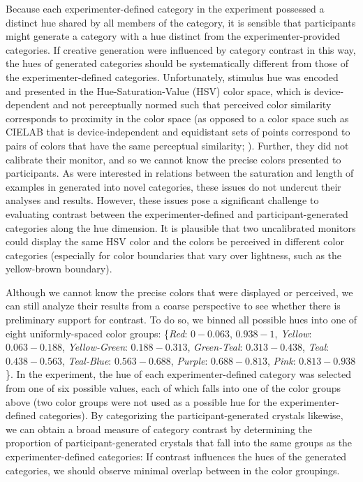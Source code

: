 \documentclass[12pt]{article}
\begin{document}
\begin{flushleft}
Because each experimenter-defined category in the \cite{jern2013probabilistic} experiment possessed a distinct hue shared by all members of the category, it is sensible that participants might generate a category with a hue distinct from the experimenter-provided categories. If creative generation were influenced by category contrast in this way, the hues of generated categories should be systematically different from those of the experimenter-defined categories. Unfortunately, stimulus hue was encoded and presented in the Hue-Saturation-Value (HSV) color space, which is device-dependent and not perceptually normed such that perceived color similarity corresponds to proximity in the color space (as opposed to a color space such as CIELAB that is device-independent and equidistant sets of points correspond to pairs of colors that have the same perceptual similarity; \citealp{wyszecki1967}). Further, they did not calibrate their monitor, and so we cannot know the precise colors presented to participants. As \cite{jern2013probabilistic} were interested in relations between the saturation and length of examples in generated into novel categories, these issues do not undercut their analyses and results. However, these issues pose a significant challenge to evaluating contrast between the experimenter-defined and participant-generated categories along the hue dimension. It is plausible that two uncalibrated monitors could display the same HSV color and the colors be perceived in different color categories (especially for color boundaries that vary over lightness, such as the yellow-brown boundary).

Although we cannot know the precise colors that were displayed or perceived, we can still analyze their results from a coarse perspective to see whether there is preliminary support for contrast. To do so, we binned all possible hues into one of eight uniformly-spaced color groups: \{{\em Red}: $0-0.063$, $0.938-1$, {\em Yellow}: $0.063-0.188$, {\em Yellow-Green}: $0.188-0.313$, {\em Green-Teal}: $0.313-0.438$, {\em Teal}: $0.438-0.563$, {\em Teal-Blue}: $0.563-0.688$, {\em Purple}: $0.688-0.813$, {\em Pink}: $0.813-0.938$\}. In the \cite{jern2013probabilistic} experiment, the hue of each experimenter-defined category was selected from one of six possible values, each of which falls into one of the color groups above (two color groups were not used as a possible hue for the experimenter-defined categories). By categorizing the participant-generated crystals likewise, we can obtain a broad measure of category contrast by determining the proportion of participant-generated crystals that fall into the same groups as the experimenter-defined categories: If contrast influences the hues of the generated categories, we should observe minimal overlap between in the color groupings.




\end{flushleft}
\end{document}
